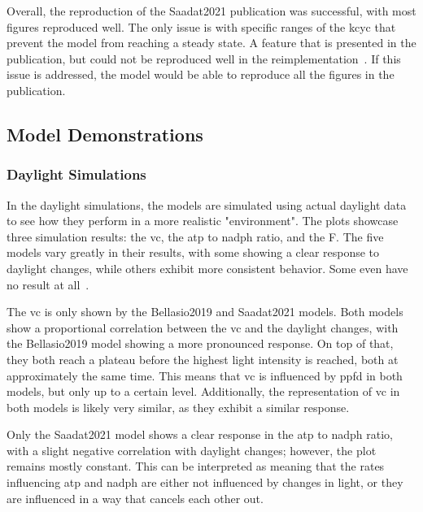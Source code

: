 Overall, the reproduction of the Saadat2021 publication was successful, with most figures reproduced well. The only issue is with specific ranges of the \gls{kcyc} that prevent the model from reaching a steady state. A feature that is presented in the publication, but could not be reproduced well in the reimplementation~. If this issue is addressed, the model would be able to reproduce all the figures in the publication.

\subsection{Model Demonstrations}

\subsubsection{Daylight Simulations}

In the daylight simulations, the models are simulated using actual daylight data to see how they perform in a more realistic "environment". The plots showcase three simulation results: the \gls{vc}, the \gls{atp} to \gls{nadph} ratio, and the \gls{F}. The five models vary greatly in their results, with some showing a clear response to daylight changes, while others exhibit more consistent behavior. Some even have no result at all~.

The \gls{vc} is only shown by the Bellasio2019 and Saadat2021 models. Both models show a proportional correlation between the \gls{vc} and the daylight changes, with the Bellasio2019 model showing a more pronounced response. On top of that, they both reach a plateau before the highest light intensity is reached, both at approximately the same time. This means that \gls{vc} is influenced by \gls{ppfd} in both models, but only up to a certain level. Additionally, the representation of \gls{vc} in both models is likely very similar, as they exhibit a similar response.

Only the Saadat2021 model shows a clear response in the \gls{atp} to \gls{nadph} ratio, with a slight negative correlation with daylight changes; however, the plot remains mostly constant. This can be interpreted as meaning that the rates influencing \gls{atp} and \gls{nadph} are either not influenced by changes in light, or they are influenced in a way that cancels each other out.

